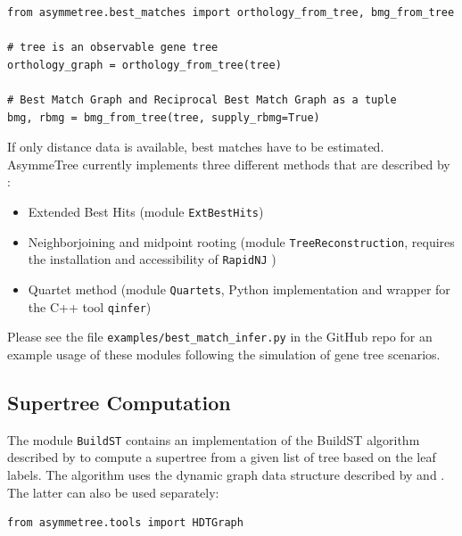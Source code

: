 \documentclass[hidelinks,11pt]{article}
\begin{document}
\begin{adjustwidth}{1cm}{1cm}\vspace{2mm}
\begin{verbatim}
from asymmetree.best_matches import orthology_from_tree, bmg_from_tree

# tree is an observable gene tree
orthology_graph = orthology_from_tree(tree)

# Best Match Graph and Reciprocal Best Match Graph as a tuple
bmg, rbmg = bmg_from_tree(tree, supply_rbmg=True)
\end{verbatim}
\end{adjustwidth}

\noindent
If only distance data is available, best matches have to be estimated.
AsymmeTree currently implements three different methods that are described by \citet{stadler2020}:
\begin{itemize}
	\item Extended Best Hits (module \texttt{ExtBestHits})
	\item Neighborjoining \cite{saitou1987} and midpoint rooting (module \texttt{TreeReconstruction}, requires the installation and accessibility of \texttt{RapidNJ} \citep{simonsen2008})
	\item Quartet method (module \texttt{Quartets}, Python implementation and wrapper for the C++ tool \texttt{qinfer})
\end{itemize}

Please see the file \texttt{examples/best\_match\_infer.py} in the GitHub repo for an example usage of these modules following the simulation of gene tree scenarios.



\subsection{Supertree Computation}

The module \texttt{BuildST} contains an implementation of the BuildST algorithm described by \citet{deng2016} to compute a supertree from a given list of tree based on the leaf labels.
The algorithm uses the dynamic graph data structure described by \citet{henzinger1995} and \citet{holm2001}.
The latter can also be used separately:

\begin{adjustwidth}{1cm}{1cm}\vspace{2mm}
\begin{verbatim}
from asymmetree.tools import HDTGraph
\end{verbatim}
\end{adjustwidth}
\end{document}
